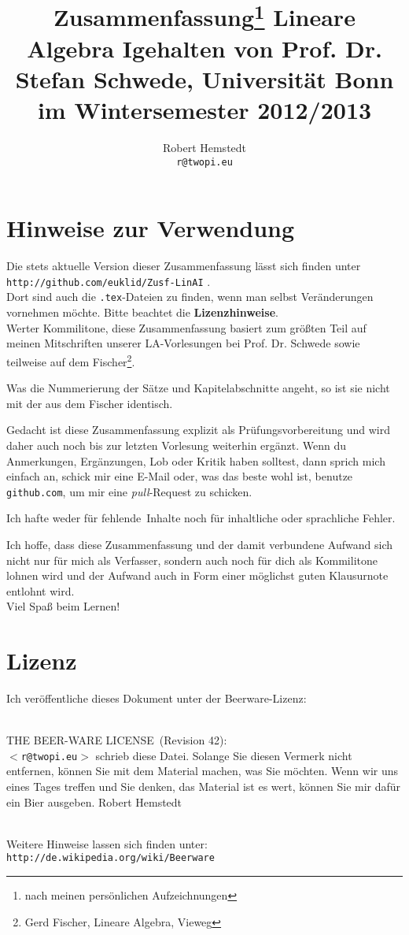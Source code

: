 \documentclass[12pt,a4paper]{article}
\author{Robert Hemstedt \\ \texttt{r@twopi.eu}}
\title{Zusammenfassung\footnote{nach meinen pers\"onlichen Aufzeichnungen} Lineare Algebra I\newline \newline \large{gehalten von Prof. Dr. Stefan Schwede, Universität Bonn} \\im Wintersemester 2012/2013}
\theoremstyle{plain}
\numberwithin{equation}{section}
\newenvironment{fmpage}[1]
{\begin{lrbox}{\fmbox}\begin{minipage}{#1}}
{\end{minipage}\end{lrbox}\fbox{\usebox{\fmbox}}}
\begin{document}
\maketitle
\section*{Hinweise zur Verwendung}
Die stets aktuelle Version dieser Zusammenfassung lässt sich finden unter\\
\texttt{http://github.com/euklid/Zusf-LinAI} .\\
Dort sind auch die \texttt{.tex}-Dateien zu finden, wenn man selbst Veränderungen vornehmen möchte. Bitte beachtet die \textbf{Lizenzhinweise}.\\

Werter Kommilitone, diese Zusammenfassung basiert zum größten Teil auf meinen Mitschriften unserer LA-Vorlesungen bei Prof. Dr. Schwede sowie teilweise auf dem Fischer\footnote{Gerd Fischer, Lineare Algebra, Vieweg}. 

Was die Nummerierung der Sätze und Kapitelabschnitte angeht, so ist sie nicht mit der aus dem Fischer identisch.

Gedacht ist diese Zusammenfassung explizit als Prüfungsvorbereitung und wird daher auch noch bis zur letzten Vorlesung weiterhin ergänzt. Wenn du Anmerkungen, Ergänzungen, Lob oder Kritik haben solltest, dann sprich mich einfach an, schick mir eine E-Mail oder, was das beste wohl ist, benutze \texttt{github.com}, um mir eine \textit{pull}-Request zu schicken.

Ich hafte weder für \glqq fehlende\grqq\ Inhalte noch für inhaltliche oder sprachliche Fehler.

Ich hoffe, dass diese Zusammenfassung und der damit verbundene Aufwand sich nicht nur für mich als Verfasser, sondern auch noch für dich als Kommilitone lohnen wird und der Aufwand auch in Form einer möglichst guten Klausurnote entlohnt wird. \\
Viel Spaß beim Lernen!
\section*{Lizenz}
Ich veröffentliche dieses Dokument unter der Beerware-Lizenz:\\ \\
\hspace{-3.5cm}
\begin{fmpage}{\textwidth}
\glqq THE BEER-WARE LICENSE\grqq\ (Revision 42):\\
\texttt{$<$r@twopi.eu$>$} schrieb diese Datei. Solange Sie diesen Vermerk nicht entfernen, können Sie mit dem Material machen, was Sie möchten. Wenn wir uns eines Tages treffen und Sie denken, das Material ist es wert, können Sie mir dafür ein Bier ausgeben. Robert Hemstedt
\end{fmpage}
\hspace{3.5cm} \\
Weitere Hinweise lassen sich finden unter: \texttt{http://de.wikipedia.org/wiki/Beerware}
\end{document}
